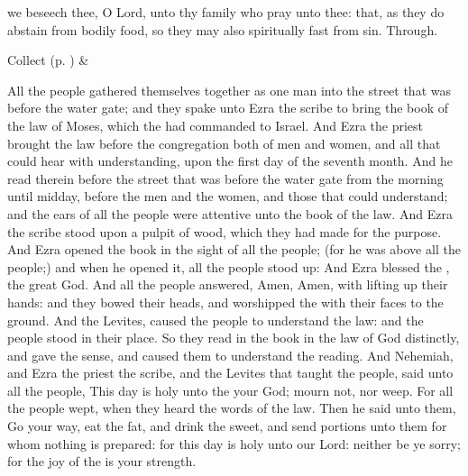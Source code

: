 
\collect
{} we beseech thee, O Lord, unto thy family who pray unto thee: that, as they do abstain from bodily food, so they may also spiritually fast from sin. Through.
\begin{rubric}
     Collect  (p. \pageref{SPSaints}) \&  
\end{rubric}

 All the people gathered themselves together as one man into the street that was before the water gate; and they spake unto Ezra the scribe to bring the book of the law of Moses, which the  had commanded to Israel. And Ezra the priest brought the law before the congregation both of men and women, and all that could hear with understanding, upon the first day of the seventh month. And he read therein before the street that was before the water gate from the morning until midday, before the men and the women, and those that could understand; and the ears of all the people were attentive unto the book of the law. And Ezra the scribe stood upon a pulpit of wood, which they had made for the purpose. And Ezra opened the book in the sight of all the people; (for he was above all the people;) and when he opened it, all the people stood up: And Ezra blessed the , the great God. And all the people answered, Amen, Amen, with lifting up their hands: and they bowed their heads, and worshipped the  with their faces to the ground. And the Levites, caused the people to understand the law: and the people stood in their place. So they read in the book in the law of God distinctly, and gave the sense, and caused them to understand the reading. And Nehemiah, and Ezra the priest the scribe, and the Levites that taught the people, said unto all the people, This day is holy unto the  your God; mourn not, nor weep. For all the people wept, when they heard the words of the law. Then he said unto them, Go your way, eat the fat, and drink the sweet, and send portions unto them for whom nothing is prepared: for this day is holy unto our Lord: neither be ye sorry; for the joy of the  is your strength.


